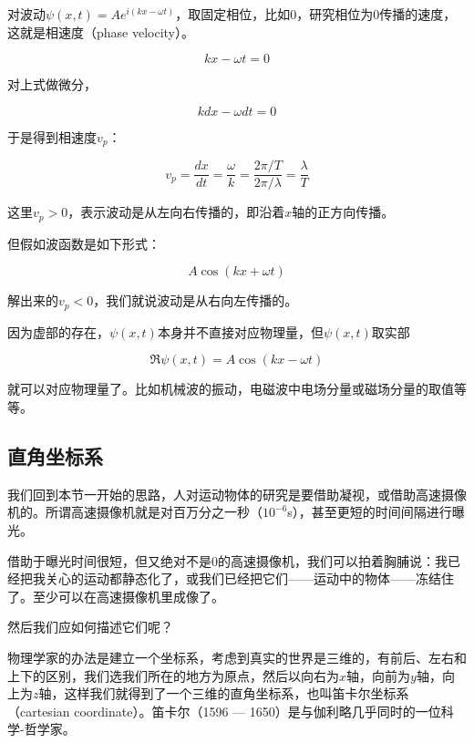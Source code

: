 对波动$\psi(x,t) =  A e^{i (kx - \omega t)} $，取固定相位，比如0，研究相位为0传播的速度，这就是相速度（phase velocity）。

\begin{equation*}
 k x  - \omega t = 0
\end{equation*}

对上式做微分，

\begin{equation*}
 k dx - \omega dt  = 0
\end{equation*}

于是得到相速度$v_p$：

\begin{equation}
v_p = \frac{dx}{dt}= \frac{\omega}{k} = \frac{2 \pi / T}{2 \pi / \lambda} = \frac{\lambda }{T }
\end{equation}

这里$v_p > 0$，表示波动是从左向右传播的，即沿着$x$轴的正方向传播。

但假如波函数是如下形式：

\begin{equation}
A \cos (kx + \omega t)
\end{equation}

解出来的$v_p < 0$，我们就说波动是从右向左传播的。


因为虚部的存在，$\psi (x,t)$本身并不直接对应物理量，但$\psi (x,t)$取实部

\begin{equation*}
\Re \psi (x,t) = A \cos (kx - \omega t)
\end{equation*}

就可以对应物理量了。比如机械波的振动，电磁波中电场分量或磁场分量的取值等等。


\subsection{直角坐标系}

我们回到本节一开始的思路，人对运动物体的研究是要借助凝视，或借助高速摄像机的。所谓高速摄像机就是对百万分之一秒（$10^{-6}$s），甚至更短的时间间隔进行曝光。

借助于曝光时间很短，但又绝对不是0的高速摄像机，我们可以拍着胸脯说：我已经把我关心的运动都静态化了，或我们已经把它们——运动中的物体——冻结住了。至少可以在高速摄像机里成像了。

然后我们应如何描述它们呢？

物理学家的办法是建立一个坐标系，考虑到真实的世界是三维的，有前后、左右和上下的区别，我们选我们所在的地方为原点，然后以向右为$x$轴，向前为$y$轴，向上为$z$轴，这样我们就得到了一个三维的直角坐标系，也叫笛卡尔坐标系（cartesian coordinate）。笛卡尔（1596 — 1650）是与伽利略几乎同时的一位科学-哲学家。

